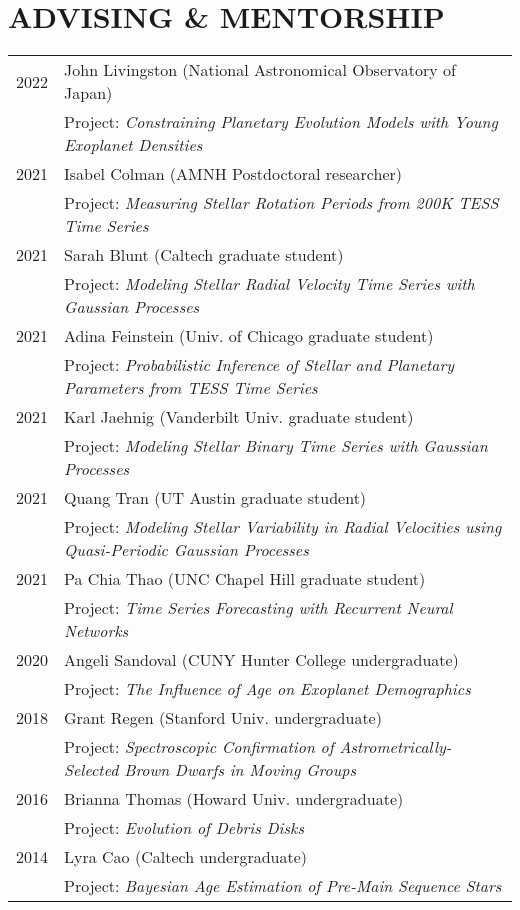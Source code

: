 \section{\large ADVISING \& MENTORSHIP}
\begin{tabular}{ll}
2022 & John Livingston (National Astronomical Observatory of Japan) \\
& Project: \textit{Constraining Planetary Evolution Models with Young Exoplanet Densities}\\
2021 & Isabel Colman (AMNH Postdoctoral researcher) \\
& Project: \textit{Measuring Stellar Rotation Periods from 200K TESS Time Series}\\
2021 & Sarah Blunt (Caltech graduate student) \\
& Project: \textit{Modeling Stellar Radial Velocity Time Series with Gaussian Processes}\\
2021 & Adina Feinstein (Univ. of Chicago graduate student) \\
& Project: \textit{Probabilistic Inference of Stellar and Planetary Parameters from TESS Time Series}\\
2021 & Karl Jaehnig (Vanderbilt Univ. graduate student) \\
& Project: \textit{Modeling Stellar Binary Time Series with Gaussian Processes} \\
2021 & Quang Tran (UT Austin graduate student)\\
& Project: \textit{Modeling Stellar Variability in Radial Velocities using Quasi-Periodic Gaussian Processes}\\
2021 & Pa Chia Thao (UNC Chapel Hill graduate student)\\
& Project: \textit{Time Series Forecasting with Recurrent Neural Networks}\\
2020 & Angeli Sandoval (CUNY Hunter College undergraduate)\\
& Project: \textit{The Influence of Age on Exoplanet Demographics}\\
2018 & Grant Regen (Stanford Univ. undergraduate) \\
& Project: \textit{Spectroscopic Confirmation of Astrometrically-Selected Brown Dwarfs in Moving Groups}\\ 
2016 & Brianna Thomas (Howard Univ. undergraduate) \\
& Project: \textit{Evolution of Debris Disks}\\
2014 & Lyra Cao (Caltech undergraduate) \\
 & Project: \textit{Bayesian Age Estimation of Pre-Main Sequence Stars}\\
\end{tabular} 
